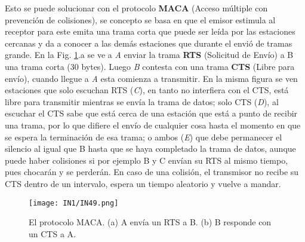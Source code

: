 \documentclass[
	12pt, %
	fleqn, %
	a4paper, %
]{LegrandOrangeBook}
\begin{document}
Esto se puede solucionar con el protocolo \textbf{MACA} (Acceso múltiple con prevención de colisiones), se concepto se basa en que el emisor estimula al receptor para este emita una trama corta que puede ser leída por las estaciones cercanas y da a conocer a las demás estaciones que durante el envió de tramas grande. En la Fig. \ref{fig:MACA}.a se ve a \textit{A} enviar la trama \textbf{RTS} (Solicitud de Envío) a B una trama corta (30 bytes). Luego \textit{B} contesta con una trama \textbf{CTS} (Libre para envío), cuando llegue a \textit{A} esta comienza a transmitir. En la misma figura se ven estaciones que solo escuchan RTS (\textit{C}), en tanto no interfiera con el CTS, está libre para transmitir mientras se envía la trama de datos; solo CTS (\textit{D}), al escuchar el CTS sabe que está cerca de una estación que está a punto de recibir una trama, por lo que difiere el envío de cualquier cosa hasta el momento en que se espera la terminación de esa trama; o ambos (\textit{E}) que debe permanecer el silencio al igual que B hasta que se haya completado la trama de datos, aunque puede haber colisiones si por ejemplo B y C envían su RTS al mismo tiempo, pues chocarán y se perderán. En caso de una colisión, el transmisor no recibe su CTS dentro de un intervalo, espera un tiempo aleatorio y vuelve a mandar.
\begin{figure}[H]
\centering
\texttt{[image: IN1/IN49.png]}
\caption{El protocolo MACA. (a) A envía un RTS a B. (b) B responde con un CTS a A.}
\label{fig:MACA}
\end{figure}
\end{document}
